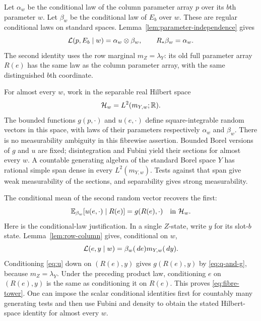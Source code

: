 Let $\alpha_w$ be the conditional law of the column parameter
array $p$ over its $b$th parameter $w$. Let $\beta_w$ be the
conditional law of $E_b$ over $w$. These are regular conditional
laws on standard spaces. Lemma~\ref{lem:parameter-independence}
gives
\begin{equation}
 \mathcal L(p,E_b\mid w)=\alpha_w\otimes\beta_w,
 \qquad R_*\beta_w=\alpha_w.
 \label{eq:parameter-disintegrations}
\end{equation}
The second identity uses the row marginal $m_Z=\lambda_Y$:
its old full parameter array $R(e)$ has the same law as the column
parameter array, with the same distinguished $b$th coordinate.

For almost every $w$, work in the separable real Hilbert space
\[
  \mathcal H_w=L^2(m_{Y,w};\mathbb R).
\]
The bounded functions $g(p,\cdot)$ and $u(e,\cdot)$ define
square-integrable random vectors in this space, with laws of their
parameters respectively $\alpha_w$ and $\beta_w$. There is no
measurability ambiguity in this fibrewise assertion. Bounded Borel
versions of $g$ and $u$ are fixed; disintegration and Fubini yield
their sections for almost every $w$. A countable generating algebra
of the standard Borel space $Y$ has rational simple span dense in
every $L^2(m_{Y,w})$. Tests against that span give weak measurability
of the sections, and separability gives strong measurability.

The conditional mean of the second random vector recovers the first:
\begin{equation}
 \mathbb E_{\beta_w}[u(e,\cdot)\mid R(e)]
     =g(R(e),\cdot)
 \quad\text{in }\mathcal H_w.
 \label{eq:fibre-tower}
\end{equation}
Here is the conditional-law justification. In a single $Z$-state,
write $y$ for its slot-$b$ state. Lemma~\ref{lem:row-column} gives,
conditional on $w$,
\[
  \mathcal L(e,y\mid w)=\beta_w(\,d e)m_{Y,w}(\,d y).
\]
Conditioning \eqref{eq:u} down on $(R(e),y)$ gives
$g(R(e),y)$ by \eqref{eq:q-and-g}, because $m_Z=\lambda_Y$.
Under the preceding product law, conditioning $e$ on $(R(e),y)$
is the same as conditioning it on $R(e)$. This proves
\eqref{eq:fibre-tower}. One can impose the scalar conditional
identities first for countably many generating tests and then use
Fubini and density to obtain the stated Hilbert-space identity for
almost every $w$.

